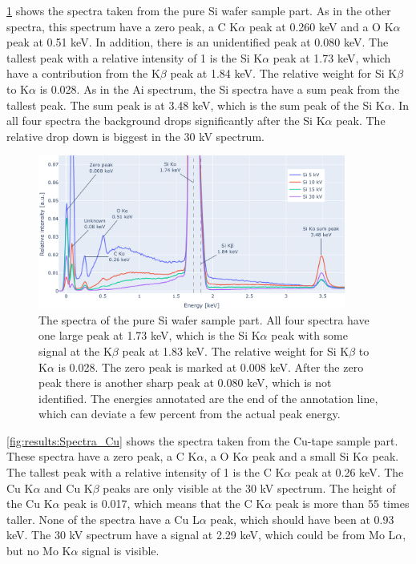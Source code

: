 \cref{fig:results:Spectra_Si} shows the spectra taken from the pure Si wafer sample part.
As in the other spectra, this spectrum have a zero peak, a C K$\alpha$ peak at 0.260 keV and a O K$\alpha$ peak at 0.51 keV.
In addition, there is an unidentified peak at 0.080 keV.
The tallest peak with a relative intensity of 1 is the Si K$\alpha$ peak at 1.73 keV, which have a contribution from the K$\beta$ peak at 1.84 keV.
The relative weight for Si K$\beta$ to K$\alpha$ is 0.028.
As in the Ai spectrum, the Si spectra have a sum peak from the tallest peak.
The sum peak is at 3.48 keV, which is the sum peak of the Si K$\alpha$.
In all four spectra the background drops significantly after the Si K$\alpha$ peak.
The relative drop down is biggest in the 30 kV spectrum.

\begin{figure}[h]
    \centering
    \includegraphics[width=0.90\textwidth]{figures/each_spectra_not_on_github/Si_everything.png}
    \caption{
        The spectra of the pure Si wafer sample part.
        All four spectra have one large peak at 1.73 keV, which is the Si K$\alpha$ peak with some signal at the K$\beta$ peak at 1.83 keV.
        The relative weight for Si K$\beta$ to K$\alpha$ is 0.028.
        The zero peak is marked at 0.008 keV.
        After the zero peak there is another sharp peak at 0.080 keV, which is not identified.
        The energies annotated are the end of the annotation line, which can deviate a few percent from the actual peak energy.
    }
    \label{fig:results:Spectra_Si}
\end{figure}


\cref{fig:results:Spectra_Cu} shows the spectra taken from the Cu-tape sample part.
These spectra have a zero peak, a C K$\alpha$, a O K$\alpha$ peak and a small Si K$\alpha$ peak.
The tallest peak with a relative intensity of 1 is the C K$\alpha$ peak at 0.26 keV.
The Cu K$\alpha$ and Cu K$\beta$ peaks are only visible at the 30 kV spectrum.
The height of the Cu K$\alpha$ peak is 0.017, which means that the C K$\alpha$ peak is more than 55 times taller.
None of the spectra have a Cu L$\alpha$ peak, which should have been at 0.93 keV.
The 30 kV spectrum have a signal at 2.29 keV, which could be from Mo L$\alpha$, but no Mo K$\alpha$ signal is visible.

